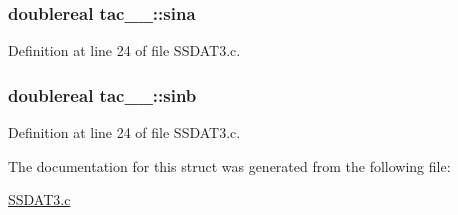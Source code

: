 \subsubsection[{\texorpdfstring{sina}{sina}}]{\setlength{\rightskip}{0pt plus 5cm}doublereal tac\+\_\+\_\+\+::sina}\hypertarget{structtac__1___adc1fc802007127aaa0a665956cc8d696}{}\label{structtac__1___adc1fc802007127aaa0a665956cc8d696}


Definition at line 24 of file S\+S\+D\+A\+T3.\+c.

\subsubsection[{\texorpdfstring{sinb}{sinb}}]{\setlength{\rightskip}{0pt plus 5cm}doublereal tac\+\_\+\_\+\+::sinb}\hypertarget{structtac__1___a496bfd84cb97870d5d4512d4c7d836fd}{}\label{structtac__1___a496bfd84cb97870d5d4512d4c7d836fd}


Definition at line 24 of file S\+S\+D\+A\+T3.\+c.



The documentation for this struct was generated from the following file\+:\begin{DoxyCompactItemize}
\item 
\hyperlink{SSDAT3_8c}{S\+S\+D\+A\+T3.\+c}\end{DoxyCompactItemize}

